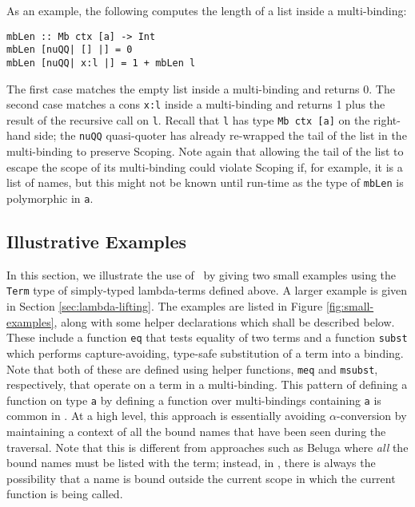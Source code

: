 \documentclass[natbib]{sigplanconf}
\begin{document}
As an example, the following computes the length of a list
inside a multi-binding:
\begin{lstlisting}
mbLen :: Mb ctx [a] -> Int
mbLen [nuQQ| [] |] = 0
mbLen [nuQQ| x:l |] = 1 + mbLen l
\end{lstlisting}
The first case matches the empty list inside a multi-binding and
returns 0. The second case matches a cons \lstinline{x:l} inside a
multi-binding and returns 1 plus the result of the recursive call on
\lstinline{l}. Recall that \lstinline{l} has type %
\lstinline{Mb ctx [a]} on the right-hand side; the \lstinline{nuQQ}
quasi-quoter has already re-wrapped the tail of the list in the
multi-binding to preserve Scoping. Note again that allowing the tail
of the list to escape the scope of its multi-binding could violate
Scoping if, for example, it is a list of names, but this might not be
known until run-time as the type of \lstinline{mbLen} is polymorphic
in \lstinline{a}.

\subsection{Illustrative Examples}
\label{subsec:small-examples}

In this section, we illustrate the use of \ourlib\ by giving two small
examples using the \lstinline{Term} type of simply-typed lambda-terms
defined above. A larger example is given in Section
\ref{sec:lambda-lifting}. The examples are listed in Figure
\ref{fig:small-examples}, along with some helper declarations which
shall be described below. These include a function \lstinline{eq} that
tests equality of two terms and a function \lstinline{subst} which
performs capture-avoiding, type-safe substitution of a term into a
binding. Note that both of these are defined using helper functions,
\lstinline{meq} and \lstinline{msubst}, respectively, that operate on
a term in a multi-binding.  This pattern of defining a function on
type \lstinline{a} by defining a function over multi-bindings
containing \lstinline{a} is common in \ourlib. At a high level, this
approach is essentially avoiding $\alpha$-conversion by maintaining a
context of all the bound names that have been seen during the
traversal. Note that this is different from approaches such as Beluga
\cite{pientka08} where \emph{all} the bound names must be listed with
the term; instead, in \ourlib, there is always the possibility that a
name is bound outside the current scope in which the current function
is being called.
\end{document}
